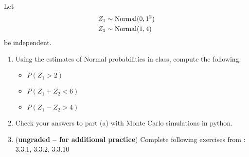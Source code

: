 \begin{exercise} 
Let 
\begin{align*}
Z_1 &\sim {\rm Normal}(0,1^2)\\
Z_1 &\sim {\rm Normal}(1,4)
\end{align*} 
be independent. 
\begin{enumerate}[label=(\alph*)]
\item Using the estimates of Normal probabilities in class, compute the following: 
\begin{itemize}
\item $P(Z_1>2)$
\item $P(Z_1 + Z_2<6)$
\item $P(Z_1 - Z_2>4)$
\end{itemize}
\item Check your answers to part (a) with Monte Carlo simulations in python. 
\item ({\bf ungraded -- for additional practice}) Complete following exercises from  \cite{tabak}: 3.3.1, 3.3.2, 3.3.10
\end{enumerate}
%
\end{exercise}

